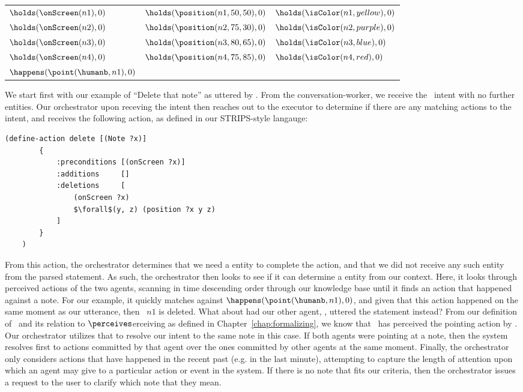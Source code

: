 \begin{center}
\begin{tabular}{ l l l }
    $\holds(\onScreen(n1), 0)$ &
    $\holds(\position(n1, 50, 50), 0)$ &
    $\holds(\isColor(n1, yellow), 0)$ \\
    $\holds(\onScreen(n2), 0)$ &
    $\holds(\position(n2, 75, 30), 0)$ &
    $\holds(\isColor(n2, purple), 0)$ \\
    $\holds(\onScreen(n3), 0)$ &
    $\holds(\position(n3, 80, 65), 0)$ &
    $\holds(\isColor(n3, blue), 0)$ \\
    $\holds(\onScreen(n4), 0)$ &
    $\holds(\position(n4, 75, 85), 0)$ &
    $\holds(\isColor(n4, red), 0)$ \\
    $\happens(\point(\humanb, n1), 0)$
\end{tabular}
\end{center}

We start first with our example of ``Delete that note'' as uttered by \humanb. From the conversation-worker,
we receive the \delete\ intent with no further entities. Our orchestrator upon receving the intent then
reaches out to the executor to determine if there are any matching actions to the intent, and receives
the following action, as defined in our STRIPS-style langauge:


\begin{lstlisting}[caption=delete,mathescape=true]
    (define-action delete [(Note ?x)]
        {
            :preconditions [(onScreen ?x)]
            :additions     []
            :deletions     [
                (onScreen ?x)
                $\forall$(y, z) (position ?x y z)
            ]
        }
    )
\end{lstlisting}

From this action, the orchestrator determines that we need a \Note entity to complete the
action, and that we did not receive any such entity from the parsed statement. As such,
the orchestrator then looks to see if it can determine a \Note entity from our context. Here,
it looks through perceived actions of the two agents, scanning in time descending order through
our knowledge base until it finds an action that happened against a note. For our example, it
quickly matches against $\happens(\point(\humanb, n1), 0)$, and given that this action happened
on the same moment as our utterance, then \Note\ $n1$ is deleted. What about had our other agent,
\humana, uttered the statement instead? From our definition of \vicinity\ and its relation to $\perceives$erceiving
as defined in Chapter~\ref{chap:formalizing}, we know that \humana\ has perceived the pointing action
by \humanb. Our orchestrator utilizes that to resolve our intent to the same note in this case.
If both agents were pointing at a note, then the system resolves first to actions committed by that
agent over the ones committed by other agents at the same moment. Finally, the orchestrator
only considers actions that have happened in the recent past (e.g. in the last minute), attempting
to capture the length of attention upon which an agent may give to a particular action or event in
the system. If there is no note that fits our criteria, then the orchestrator issues a request
to the user to clarify which note that they mean.

